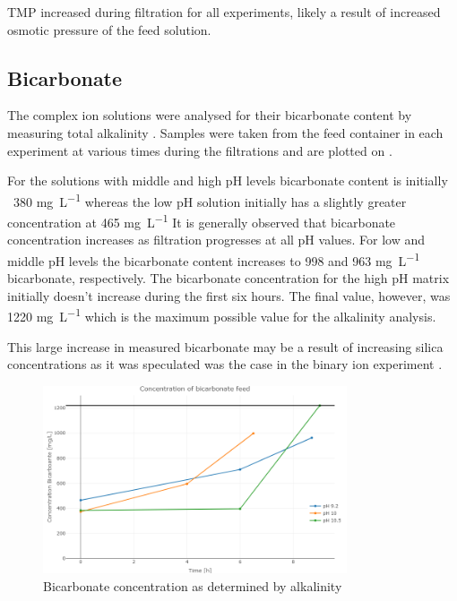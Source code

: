 TMP increased during filtration for all experiments, likely a result of increased osmotic pressure of the feed solution.



\subsection{Bicarbonate}

The complex ion solutions were analysed for their bicarbonate content by measuring total alkalinity .
Samples were taken from the feed container in each experiment at various times during the filtrations and are plotted on .

For the solutions with middle and high pH levels bicarbonate content is initially ~380 \si{\milli\gram\per\liter} whereas the low pH solution initially has a slightly greater concentration at 465 \si{\milli\gram\per\liter}
It is generally observed that bicarbonate concentration increases as filtration progresses at all pH values.
For low and middle pH levels the bicarbonate content increases to 998 and 963 \si{\milli\gram\per\liter} bicarbonate, respectively.
The bicarbonate concentration for the high pH matrix initially doesn't increase during the first six hours.
The final value, however, was 1220 \si{\milli\gram\per\liter} which is the maximum possible value for the alkalinity analysis.

This large increase in measured bicarbonate may be a result of increasing silica concentrations as it was speculated was the case in the binary ion experiment .

\begin{figure}[H]
    \centering
    \includegraphics[width=0.8\textwidth]{Billeder/data/multi_salt/bicarbonate_all_pH.png}
    \caption{Bicarbonate concentration as determined by alkalinity}
    \label{fig:bicarbonate_multi_salt}
\end{figure}

